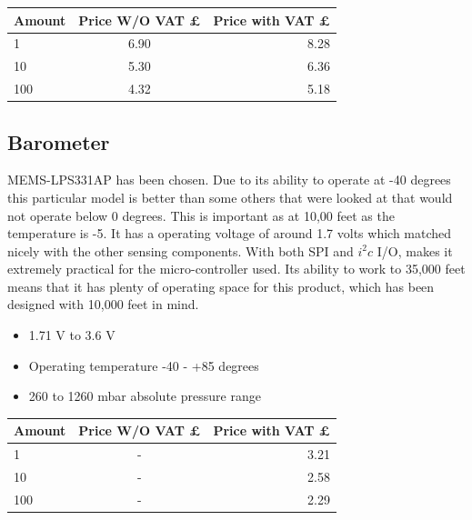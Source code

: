 \documentclass{report}
\begin{document}
\begin{center}
  \begin{tabular}{ | l | c | r |}
    \hline
    Amount & Price W/O VAT £ & Price with VAT £ \\ \hline
    1 & 6.90 & 8.28 \\ \hline
    10 & 5.30 & 6.36 \\ \hline
    100 & 4.32 & 5.18 \\ \hline
	\end{tabular}
\end{center}

\subsection{Barometer}
MEMS-LPS331AP has been chosen. Due to its ability to operate at -40 degrees this particular model is better than some others that were looked at that would not operate below 0 degrees. This is important as at 10,00 feet as the temperature is -5. It has a operating voltage of around 1.7 volts which matched nicely with the other sensing components. With both SPI and $i^2c$ I/O, makes it extremely practical for the micro-controller used. Its ability to work to 35,000 feet means that it has plenty of operating space for this product, which has been designed with 10,000 feet in mind.

\begin{itemize}
\item 1.71 V to 3.6 V
\item Operating temperature -40 - +85 degrees 
\item 260 to 1260 mbar absolute pressure range
\end{itemize}

\begin{center}
  \begin{tabular}{ | l | c | r |}
    \hline
    Amount & Price W/O VAT £ & Price with VAT £ \\ \hline
    1 & - & 3.21 \\ \hline
    10 & - & 2.58 \\ \hline
    100 & - & 2.29 \\ \hline
	\end{tabular}
\end{center}
\end{document}
